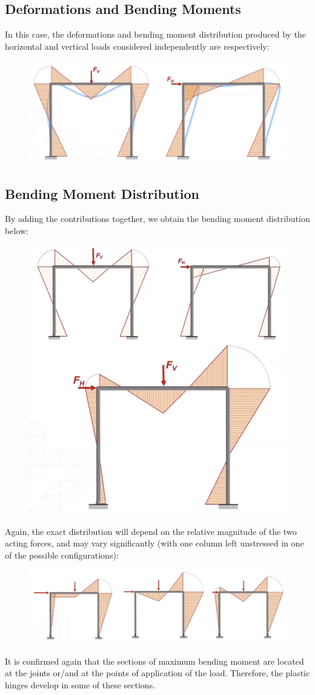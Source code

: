 \documentclass[class=report, crop=false, 12pt,a4paper]{standalone}
\begin{document}
\subsection{Deformations and Bending Moments}
In this case, the deformations and bending moment distribution produced by the horizontal and vertical loads considered independently are respectively:
\begin{figure}[H]
  \centering
  \includegraphics[width = 0.9 \textwidth]{../img/beam46.PNG}
\end{figure}
\subsection{Bending Moment Distribution}
By adding the contributions together, we obtain the bending moment distribution below:
\begin{figure}[H]
  \centering
  \includegraphics[width = 0.65 \textwidth]{../img/beam47.PNG}
\end{figure}
Again, the exact distribution will depend on the relative magnitude of the two acting forces, and may vary significantly (with one column left unstressed in one of the possible configurations):
\begin{figure}[H]
  \centering
  \includegraphics[width = 0.9 \textwidth]{../img/beam35.PNG}
\end{figure}
It is confirmed again that the sections of maximum bending moment are located at the joints or/and at the points of application of the load. Therefore, the plastic hinges develop in some of these sections.
\end{document}
